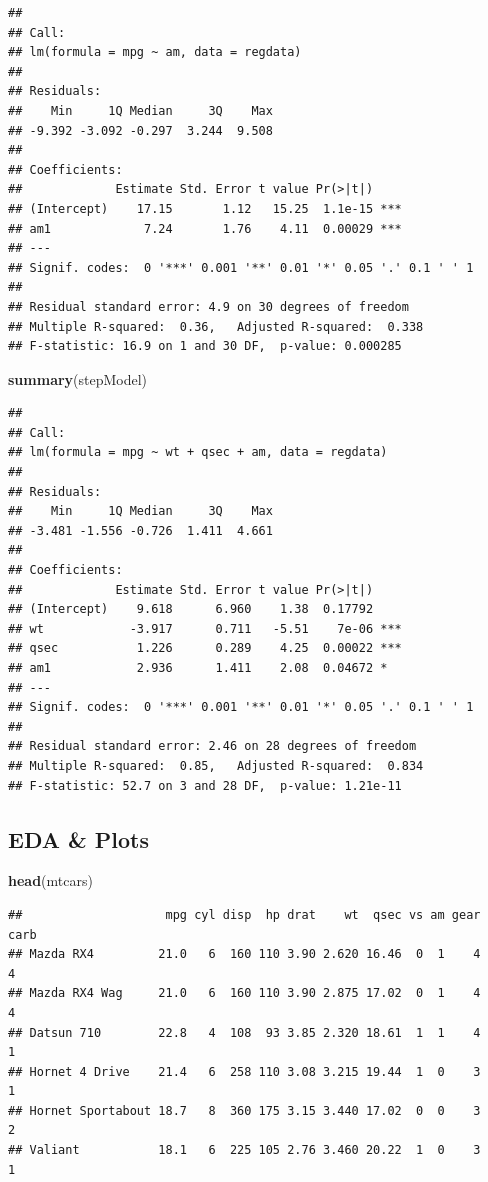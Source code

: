 \documentclass[]{article}
\newenvironment{Shaded}{\begin{snugshade}}{\end{snugshade}}
\newcommand{\KeywordTok}[1]{\textcolor[rgb]{0.13,0.29,0.53}{\textbf{{#1}}}}
\newcommand{\NormalTok}[1]{{#1}}
\begin{document}
\begin{verbatim}
## 
## Call:
## lm(formula = mpg ~ am, data = regdata)
## 
## Residuals:
##    Min     1Q Median     3Q    Max 
## -9.392 -3.092 -0.297  3.244  9.508 
## 
## Coefficients:
##             Estimate Std. Error t value Pr(>|t|)    
## (Intercept)    17.15       1.12   15.25  1.1e-15 ***
## am1             7.24       1.76    4.11  0.00029 ***
## ---
## Signif. codes:  0 '***' 0.001 '**' 0.01 '*' 0.05 '.' 0.1 ' ' 1
## 
## Residual standard error: 4.9 on 30 degrees of freedom
## Multiple R-squared:  0.36,   Adjusted R-squared:  0.338 
## F-statistic: 16.9 on 1 and 30 DF,  p-value: 0.000285
\end{verbatim}

\begin{Shaded}
\begin{Highlighting}[]
\KeywordTok{summary}\NormalTok{(stepModel)}
\end{Highlighting}
\end{Shaded}

\begin{verbatim}
## 
## Call:
## lm(formula = mpg ~ wt + qsec + am, data = regdata)
## 
## Residuals:
##    Min     1Q Median     3Q    Max 
## -3.481 -1.556 -0.726  1.411  4.661 
## 
## Coefficients:
##             Estimate Std. Error t value Pr(>|t|)    
## (Intercept)    9.618      6.960    1.38  0.17792    
## wt            -3.917      0.711   -5.51    7e-06 ***
## qsec           1.226      0.289    4.25  0.00022 ***
## am1            2.936      1.411    2.08  0.04672 *  
## ---
## Signif. codes:  0 '***' 0.001 '**' 0.01 '*' 0.05 '.' 0.1 ' ' 1
## 
## Residual standard error: 2.46 on 28 degrees of freedom
## Multiple R-squared:  0.85,   Adjusted R-squared:  0.834 
## F-statistic: 52.7 on 3 and 28 DF,  p-value: 1.21e-11
\end{verbatim}

\subsection{EDA \& Plots}\label{eda-plots}

\begin{Shaded}
\begin{Highlighting}[]
\KeywordTok{head}\NormalTok{(mtcars)}
\end{Highlighting}
\end{Shaded}

\begin{verbatim}
##                    mpg cyl disp  hp drat    wt  qsec vs am gear carb
## Mazda RX4         21.0   6  160 110 3.90 2.620 16.46  0  1    4    4
## Mazda RX4 Wag     21.0   6  160 110 3.90 2.875 17.02  0  1    4    4
## Datsun 710        22.8   4  108  93 3.85 2.320 18.61  1  1    4    1
## Hornet 4 Drive    21.4   6  258 110 3.08 3.215 19.44  1  0    3    1
## Hornet Sportabout 18.7   8  360 175 3.15 3.440 17.02  0  0    3    2
## Valiant           18.1   6  225 105 2.76 3.460 20.22  1  0    3    1
\end{verbatim}
\end{document}
